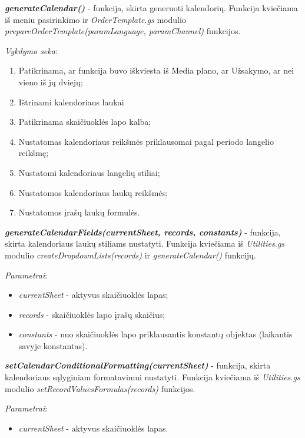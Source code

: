 \bigskip
\textit{\textbf{generateCalendar()}} - funkcija, skirta generuoti kalendorių. Funkcija kviečiama iš meniu pasirinkimo ir \textit{OrderTemplate.gs} modulio \textit{prepareOrderTemplate(paramLanguage, paramChannel)} funkcijos.

\bigskip
\textit{Vykdymo seka}:
\begin{enumerate}
    \itemsep0em 
    \item Patikrinama, ar funkcija buvo iškviesta iš Media plano, ar Užsakymo, ar nei vieno iš jų dviejų;
    \item Ištrinami kalendoriaus laukai
    \item Patikrinama skaičiuoklės lapo kalba;
    \item Nustatomas kalendoriaus reikšmės priklausomai pagal periodo langelio reikšmę;
    \item Nustatomi kalendoriaus langelių stiliai;
    \item Nustatomos kalendoriaus laukų reikšmės;
    \item Nustatomos įrašų laukų formulės.
\end{enumerate}

\bigskip
\textit{\textbf{generateCalendarFields(currentSheet, records, constants)}} - funkcija, skirta kalendoriaus laukų stiliams nustatyti. Funkcija kviečiama iš \textit{Utilities.gs} modulio \textit{createDropdownLists(records)} ir \textit{generateCalendar()} funkcijų.

\bigskip
\textit{Parametrai}:
\begin{itemize}
    \itemsep0em 
    \item \textit{currentSheet} - aktyvus skaičiuoklės lapas;
    \item \textit{records} - skaičiuoklės lapo įrašų skaičius;
    \item \textit{constants} - nuo skaičiuoklės lapo priklausantis konstantų objektas (laikantis savyje konstantas).
\end{itemize}

\bigskip
\textit{\textbf{setCalendarConditionalFormatting(currentSheet)}} - funkcija, skirta kalendoriaus sąlyginiam formatavimui nustatyti. Funkcija kviečiama iš \textit{Utilities.gs} modulio \textit{setRecordValuesFormulas(records)} funkcijos.

\bigskip
\textit{Parametrai}:
\begin{itemize}
    \itemsep0em 
    \item \textit{currentSheet} - aktyvus skaičiuoklės lapas.
\end{itemize}

